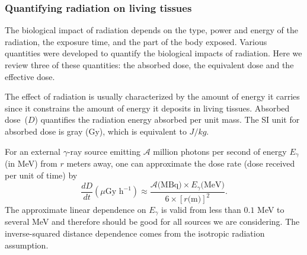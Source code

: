 \documentclass[nofootinbib,preprint,aps]{revtex4-1}
\begin{document}
        \subsubsection{Quantifying radiation on living tissues}
        The biological impact of radiation depends on the type, power and energy of the radiation, the
        exposure time, and the part of the body exposed. Various quantities were developed to
        quantify the biological impacts of radiation. Here we review three
        of these quantities: the absorbed dose, the equivalent dose and the effective dose.

        The effect of radiation is usually characterized by the amount of energy it carries since it constrains
        the amount of energy it deposits in living tissues.
        Absorbed dose~($D$) quantifies the 
        radiation energy absorbed per unit mass. The SI unit for absorbed dose is gray (Gy), which is
        equivalent to $J/kg$.

        For an external $\gamma$-ray source emitting $\mathcal{A}$ million photons per second 
        of energy $E_{\gamma}$
        (in MeV) from $r$ meters away,
        one can approximate the dose rate (dose received per unit of time) by \cite[chapt. 7]{l01}
        \begin{equation}
            \frac{dD}{dt}(\mu\text{Gy h}^{-1}) \approx \frac{\mathcal{A}\text{(MBq)}\times E_{\gamma}\text{(MeV)}}
            {6\times [r\text{(m)}]^2}.
        \end{equation}
        The approximate linear dependence on $E_{\gamma}$ is valid from less than $0.1$ MeV to several
        MeV and therefore should be good for all sources we are considering.\cite{my68}
        The inverse-squared distance dependence comes from the isotropic radiation assumption.
\end{document}
